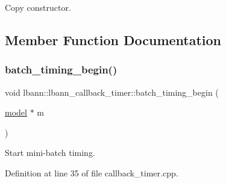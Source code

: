 Copy constructor. 

\subsection{Member Function Documentation}
\mbox{\label{classlbann_1_1lbann__callback__timer_a6a8a59707a52b8b570b7605b90fdd159}} 
\subsubsection{\texorpdfstring{batch\+\_\+timing\+\_\+begin()}{batch\_timing\_begin()}}
{\footnotesize\ttfamily void lbann\+::lbann\+\_\+callback\+\_\+timer\+::batch\+\_\+timing\+\_\+begin (\begin{DoxyParamCaption}\item[{\hyperlink{classlbann_1_1model}{model} $\ast$}]{m }\end{DoxyParamCaption})\hspace{0.3cm}{\ttfamily [private]}}

Start mini-\/batch timing. 

Definition at line 35 of file callback\+\_\+timer.\+cpp.


